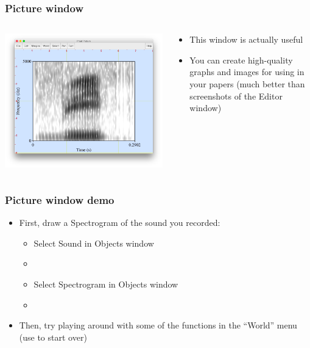 \documentclass[handout]{beamer}
\begin{document}
\begin{frame}[fragile]
\frametitle{Picture window}
    
\begin{columns}[]
  \begin{column}{0.5\textwidth}
    \includegraphics[width=\textwidth]{graphics/picturewindow.png}
  \end{column}

  \begin{column}{0.5\textwidth}
    \begin{itemize}
        \item <1-> This window is actually useful
        \item <2-> You can create high-quality graphs and images for using in your papers (much better than screenshots of the Editor window)
    \end{itemize}
  \end{column}
\end{columns}
\end{frame}

\begin{frame}[fragile]
\frametitle{Picture window demo}
    \begin{itemize}
        \item <1-> First, draw a Spectrogram of the sound you recorded:
        \begin{itemize}
            \item Select Sound in Objects window
            \item {}
            \item Select Spectrogram in Objects window
            \item {}
        \end{itemize}
        \item <1-> Then, try playing around with some of the functions in the ``World'' menu (use  to start over)
    \end{itemize}
\end{frame} 
\end{document}
